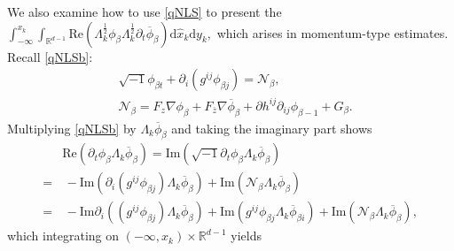\documentclass[10pt,twoside,a4paper]{article}
\numberwithin{equation}{section}\allowdisplaybreaks
\begin{document}
We also examine  how to use \eqref{qNLS} to present the $ \int_{-\infty}^{x_k} \int_{\mathbb{R}^{d-1}}  \mathrm{Re}\left( \Lambda_k^{\frac 12}\phi_{\beta}\Lambda_k^{\frac 12}\partial_t\overline{\phi}_{\beta }\right)\mathrm{d} \hat{x}_k \mathrm{d} y_k,$ which arises in momentum-type estimates.  Recall  \eqref{qNLSb}:
\begin{align*}  
	&\sqrt{-1}\phi_{\beta t}+\partial_i\left( g^{ij} \phi_{\beta j}\right)=\mathcal{N}_\beta,\\
	&\mathcal{N}_\beta=F_z\nabla \phi_\beta+F_{\overline{z}}\nabla \overline{\phi}_\beta+\partial h^{ij}\partial_{ij } \phi_{\beta -1}+G_\beta.
\end{align*}
Multiplying \eqref{qNLSb} by $ \Lambda_k \overline{\phi}_\beta $  and taking the imaginary part shows
\begin{align*} 
	&\mathrm{Re}\left(   \partial_t \phi_{\beta }  \Lambda_k\overline{\phi}_{\beta } \right)=\mathrm{Im}\left(  	\sqrt{-1} \partial_t  \phi_{\beta }  \Lambda_k\overline{\phi}_{\beta } \right)	\nonumber\\
	=&\,- \mathrm{Im} \left(  \partial_i  \left(g^{ij} \phi_{\beta j}\right)\Lambda_k\overline{\phi}_{\beta }\right)+\mathrm{Im} \left(   \mathcal{N}_\beta \Lambda_k \overline{\phi}_{\beta }\right) 	\\
	=&\,-  \mathrm{Im}\partial_i\left(  \left(g^{ij} \phi_{\beta j}\right)\Lambda_k\overline{\phi}_{\beta }\right)+\mathrm{Im} \left(  g^{ij} \phi_{\beta j}\Lambda_k\overline{\phi}_{\beta i}\right) +\mathrm{Im} \left(  \mathcal{N}_\beta \Lambda_k \overline{\phi}_{\beta }\right),	\nonumber
\end{align*}
which integrating on $ (-\infty,x_k)\times\mathbb{R}^{d-1} $ yields
\end{document}
